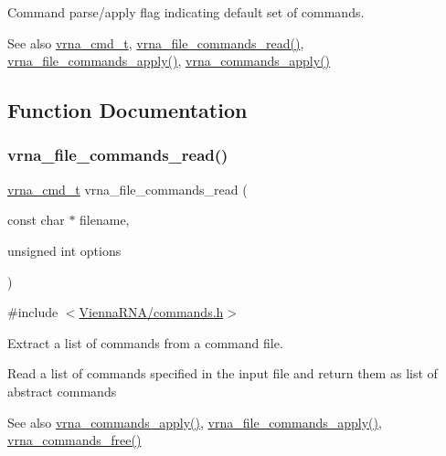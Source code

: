 Command parse/apply flag indicating default set of commands. 

\begin{DoxySeeAlso}{See also}
\mbox{\hyperlink{group__command__files_gaf31afe4c5f8e4bf44a670ab4c3dcd916}{vrna\+\_\+cmd\+\_\+t}}, \mbox{\hyperlink{group__command__files_gae5f56400ed43683338f7bf1c1102655a}{vrna\+\_\+file\+\_\+commands\+\_\+read()}}, \mbox{\hyperlink{group__command__files_gadbe8c9622f7bcc6dcbe3448b98df8656}{vrna\+\_\+file\+\_\+commands\+\_\+apply()}}, \mbox{\hyperlink{group__command__files_gac65d0fe86f7671a2d2b85dda1a3ddc16}{vrna\+\_\+commands\+\_\+apply()}} 
\end{DoxySeeAlso}


\subsection{Function Documentation}
\mbox{\label{group__command__files_gae5f56400ed43683338f7bf1c1102655a}} 
\subsubsection{\texorpdfstring{vrna\_file\_commands\_read()}{vrna\_file\_commands\_read()}}
{\footnotesize\ttfamily \mbox{\hyperlink{group__command__files_gaf31afe4c5f8e4bf44a670ab4c3dcd916}{vrna\+\_\+cmd\+\_\+t}} vrna\+\_\+file\+\_\+commands\+\_\+read (\begin{DoxyParamCaption}\item[{const char $\ast$}]{filename,  }\item[{unsigned int}]{options }\end{DoxyParamCaption})}



{\ttfamily \#include $<$\mbox{\hyperlink{commands_8h}{Vienna\+R\+N\+A/commands.\+h}}$>$}



Extract a list of commands from a command file. 

Read a list of commands specified in the input file and return them as list of abstract commands

\begin{DoxySeeAlso}{See also}
\mbox{\hyperlink{group__command__files_gac65d0fe86f7671a2d2b85dda1a3ddc16}{vrna\+\_\+commands\+\_\+apply()}}, \mbox{\hyperlink{group__command__files_gadbe8c9622f7bcc6dcbe3448b98df8656}{vrna\+\_\+file\+\_\+commands\+\_\+apply()}}, \mbox{\hyperlink{group__command__files_ga3dc372dcbb43d2c4c91b5ef79b460428}{vrna\+\_\+commands\+\_\+free()}}
\end{DoxySeeAlso}

